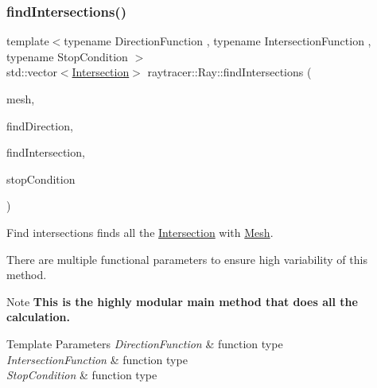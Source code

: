 \subsubsection{\texorpdfstring{find\+Intersections()}{findIntersections()}}
{\footnotesize\ttfamily template$<$typename Direction\+Function , typename Intersection\+Function , typename Stop\+Condition $>$ \\
std\+::vector$<$\hyperlink{structraytracer_1_1Intersection}{Intersection}$>$ raytracer\+::\+Ray\+::find\+Intersections (\begin{DoxyParamCaption}\item[{const \hyperlink{classraytracer_1_1Mesh}{Mesh} \&}]{mesh,  }\item[{Direction\+Function}]{find\+Direction,  }\item[{Intersection\+Function}]{find\+Intersection,  }\item[{Stop\+Condition}]{stop\+Condition }\end{DoxyParamCaption})\hspace{0.3cm}{\ttfamily [inline]}}



Find intersections finds all the \hyperlink{structraytracer_1_1Intersection}{Intersection} with \hyperlink{classraytracer_1_1Mesh}{Mesh}. 

There are multiple functional parameters to ensure high variability of this method.

\begin{DoxyNote}{Note}
{\bfseries This is the highly modular main method that does all the calculation.}
\end{DoxyNote}

\begin{DoxyTemplParams}{Template Parameters}
{\em Direction\+Function} & function type \\
\hline
{\em Intersection\+Function} & function type \\
\hline
{\em Stop\+Condition} & function type \\
\hline
\end{DoxyTemplParams}


